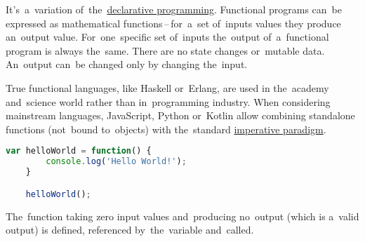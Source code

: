 \label{functionalprogramming}
It's~a~variation of~the~\hyperref[declarativeprogramming]{declarative programming}.
Functional programs can~be expressed as mathematical functions\,--\,for~a~set of~inputs values they produce an~output value.
For~one~specific set of~inputs the~output of~a~functional program is always the~same.
There are no state changes or~mutable data.
An~output can~be changed only by changing the~input.

True functional languages, like Haskell or~Erlang, are used in the~academy and~science world rather than in~programming industry.
When considering mainstream languages, JavaScript, Python or~Kotlin allow combining standalone functions (not~bound to~objects) with the~standard \hyperref[imperativeprogramming]{imperative paradigm}.

\begin{lstlisting}[language=JavaScript]
    var helloWorld = function() {
        console.log('Hello World!');
    }

    helloWorld();
\end{lstlisting}

\noindent The~function taking zero input values and~producing no~output (which is a~valid output) is defined, referenced by~the~variable and~called.
